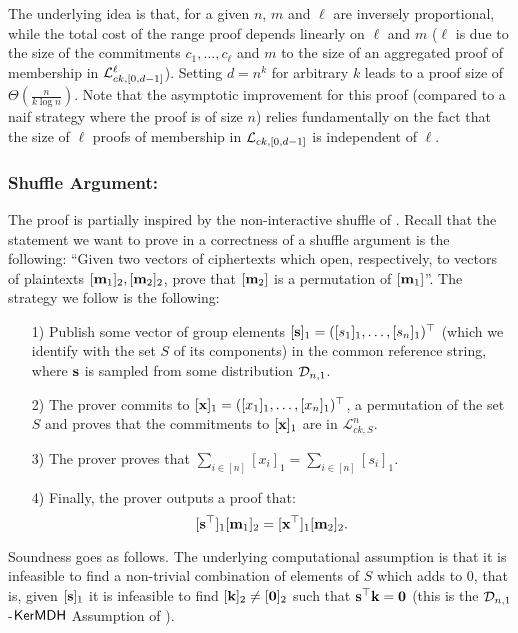 The underlying idea is that, for a given $n$, $m$ and $\ell$ are inversely proportional, while the total cost of the range proof depends linearly on $\ell$ and $m$ ($\ell$ is due to the size of the commitments $c_1,\ldots,c_\ell$ and $m$ to the size of an aggregated proof of membership in $\mathcal{L}_{ck,[0,d-1]}^\ell$).  Setting $d=n^{k}$ for arbitrary $k$ leads to a proof size of $\Theta(\frac{n}{k \log n})$. 
Note that the asymptotic improvement for this proof (compared to a naif strategy where the proof is of size $n$) relies fundamentally on the fact that the size of $\ell$ proofs of membership in $\mathcal{L}_{ck,[0,d-1]}$ is independent of $\ell$. 
  \subsubsection{Shuffle Argument:} The proof is partially inspired by the non-interactive shuffle of \cite{AC:GroLu07}. Recall that the statement we want to prove in a correctness of a shuffle argument is the following: ``Given two vectors of ciphertexts which open, respectively, to vectors of plaintexts $[\mathbf{m}_1]_2, [\mathbf{m}_2]_2$, prove that 
 $[\mathbf{m}_2]$ is a permutation of $[\mathbf{m}_1]$''. 
The strategy we follow is the following:  
\begin{itemize}
\item[1)] Publish some vector of group elements $[\mathbf{s}]_1 =([s_1]_1,\ldots,[s_n]_1)^\top$ (which we identify with the set $S$ of its components) in the common reference string, where $\mathbf{s}$ is sampled from some distribution $\mathcal{D}_{n,1}$.
\item[2)] The prover commits to $[\mathbf{x}]_1=([x_1]_1,\ldots,[x_n]_1)^\top$, a permutation of the set $S$ and proves that the commitments to $[\mathbf{x}]_1$ are in $\mathcal{L}^{n}_{ck,S}$.
\item[3)] The prover proves that $\sum_{i \in [n]} [x_i]_1 =\sum_{i \in [n]} [s_i]_1$.
\item[4)] Finally, the prover outputs a proof that: 
\begin{equation}\label{shuffle:ker}[\mathbf{s}^{\top}]_1 [\mathbf{m}_1]_2 =[\mathbf{x}^{\top}]_1 [\mathbf{m}_2]_2.
\end{equation}
\end{itemize}
Soundness goes as follows. The underlying computational assumption is that it is infeasible to find a non-trivial combination of elements of $S$ which adds to $0$, that is, given $[\mathbf{s}]_1$ it is infeasible to find $[\mathbf{k}]_2 \neq [\mathbf{0}]_2$ such that
$\mathbf{s}^{\top} \mathbf{k}=\mathbf{0}$ (this is the $\mathcal{D}_{n,1}$-$\mathsf{KerMDH}$ Assumption of \cite{EPRINT:MorRafVil15}). 
 
